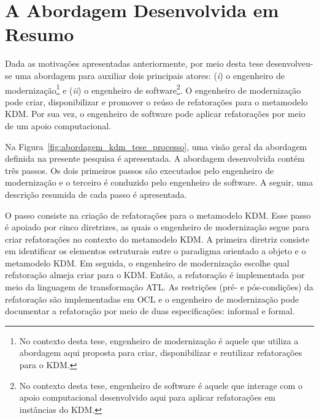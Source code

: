 

\section{A Abordagem Desenvolvida em Resumo}\label{sec:introducao:a_abordagem_desenvolvida}

Dada as motivações apresentadas anteriormente, por meio desta tese desenvolveu-se uma abordagem para auxiliar dois principais atores: (\textit{i}) o engenheiro de modernização\footnote{No contexto desta tese, engenheiro de modernização é aquele que utiliza a abordagem aqui proposta para criar, disponibilizar e reutilizar refatorações para o KDM.} e  (\textit{ii}) o engenheiro de software\footnote{No contexto desta tese, engenheiro de software é aquele que interage com o apoio computacional desenvolvido aqui para aplicar refatorações em instâncias do KDM.}. O engenheiro de modernização pode criar, disponibilizar e promover o reúso de refatorações para o metamodelo KDM. Por sua vez, o engenheiro de software pode aplicar refatorações por meio de um apoio computacional.%



Na Figura~\ref{fig:abordagem_kdm_tese_processo}, uma visão geral da abordagem definida na presente pesquisa é apresentada. A abordagem desenvolvida contém três passos. Os dois primeiros passos são executados pelo engenheiro de modernização e o terceiro é conduzido pelo engenheiro de software. A seguir, uma descrição resumida de cada passo é apresentada.

O passo  consiste na criação de refatorações para o metamodelo KDM. Esse passo é apoiado por cinco diretrizes, as quais o engenheiro de modernização segue para criar refatorações no contexto do metamodelo KDM. A primeira diretriz consiste em identificar os elementos estruturais entre o paradigma orientado a objeto e o metamodelo KDM. Em seguida, o engenheiro de modernização escolhe qual refatoração almeja criar para o KDM. Então, a refatoração é implementada por meio da linguagem de transformação ATL. As restrições (pré- e pós-condições) da refatoração são implementadas em OCL e o engenheiro de modernização pode documentar a refatoração por meio de duas especificações: informal e formal.




